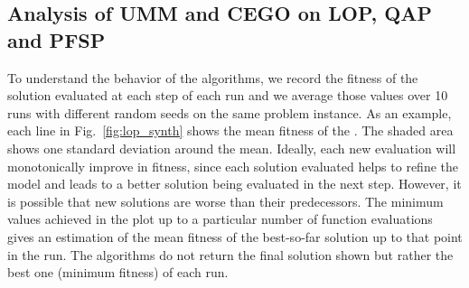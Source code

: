 \documentclass[sigconf,dvipsnames]{acmart}
\newcommand{\supplement}{\href{http://doi.org/10.5281/zenodo.4167148}{doi:10.5281/zenodo.4167148}}
\begin{document}

\subsection{Analysis of UMM and CEGO on LOP, QAP and PFSP}
To  understand the behavior of the algorithms, we record the fitness of
the solution evaluated at each step of each run and we average those values
over 10 runs with different random seeds on the same problem instance.  As an
example, each line in Fig.~\ref{fig:lop_synth} shows the mean fitness of the
. The
shaded area shows one standard deviation around the mean. Ideally, each new
evaluation will monotonically improve in fitness, since each solution evaluated
helps to refine the model and leads to a better solution being evaluated in the
next step.  However, it is possible that new solutions are worse
than their predecessors. %
The minimum values
achieved in the plot up to a particular number of function evaluations gives an
estimation of the mean fitness of the best-so-far solution up to that point in
the run. The algorithms do not return the final solution shown but rather the
best one (minimum fitness) of each run.
\end{document}

